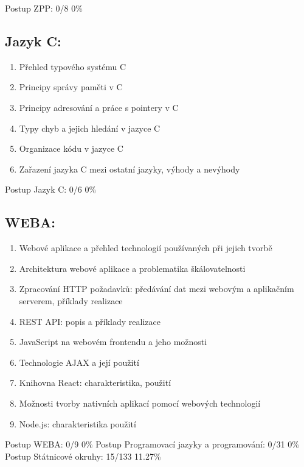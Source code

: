 \documentclass{article}
\begin{document}
	Postup ZPP: 0/8 0\%
	
	\subsection*{Jazyk C:}
	
	\begin{enumerate}[label=\arabic*.]
		\item Přehled typového systému C
		\item Principy správy paměti v C
		\item Principy adresování a práce s pointery v C
		\item Typy chyb a jejich hledání v jazyce C
		\item Organizace kódu v jazyce C
		\item Zařazení jazyka C mezi ostatní jazyky, výhody a nevýhody
	\end{enumerate}
	
	Postup Jazyk C: 0/6 0\%
	
	\subsection*{WEBA:}
	
	\begin{enumerate}[label=\arabic*.]
		\item Webové aplikace a přehled technologií používaných při jejich tvorbě
		\item Architektura webové aplikace a problematika škálovatelnosti
		\item Zpracování HTTP požadavků: předávání dat mezi webovým a aplikačním serverem, příklady realizace
		\item REST API: popis a příklady realizace
		\item JavaScript na webovém frontendu a jeho možnosti
		\item Technologie AJAX a její použití
		\item Knihovna React: charakteristika, použití
		\item Možnosti tvorby nativních aplikací pomocí webových technologií
		\item Node.js: charakteristika použití
	\end{enumerate}
	
	Postup WEBA: 0/9 0\%
	\newline
	\newline
	Postup Programovací jazyky a programování: 0/31 0\%
	\newline
	\newline
	Postup Státnicové okruhy: 15/133 11.27\%
	
\end{document}
